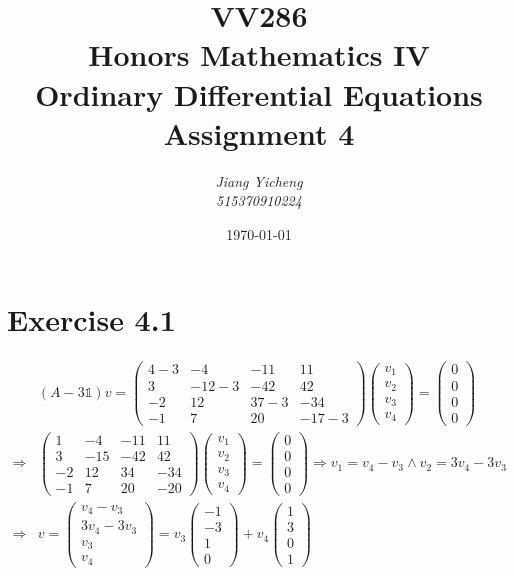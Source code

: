 \documentclass[a4paper,12pt,titlepage]{article}
\author{\textit{Jiang Yicheng}\\\textit{515370910224}}
\title{\textbf{VV286\\ Honors Mathematics IV\\
Ordinary Differential Equations\\
		Assignment 4}}
\date{\today}
\begin{document}
\maketitle

\section*{Exercise 4.1}
\begin{align*}
&(A-3\mathds{1})v=\left(\begin{array}{cccc}
4-3&-4&-11&11\\
3&-12-3&-42&42\\
-2&12&37-3&-34\\
-1&7&20&-17-3
\end{array}\right)\left(\begin{array}{c}
v_1\\
v_2\\
v_3\\
v_4
\end{array}\right)=\left(\begin{array}{c}
0\\
0\\
0\\
0
\end{array}\right)\\
\Rightarrow& \left(\begin{array}{cccc}
1&-4&-11&11\\
3&-15&-42&42\\
-2&12&34&-34\\
-1&7&20&-20
\end{array}\right)\left(\begin{array}{c}
v_1\\
v_2\\
v_3\\
v_4
\end{array}\right)=\left(\begin{array}{c}
0\\
0\\
0\\
0
\end{array}\right)\Rightarrow v_1=v_4-v_3\wedge v_2=3v_4-3v_3\\
\Rightarrow& v=\left(\begin{array}{c}
v_4-v_3\\
3v_4-3v_3\\
v_3\\
v_4
\end{array}\right)=v_3\left(\begin{array}{c}
-1\\
-3\\
1\\
0
\end{array}\right)+v_4\left(\begin{array}{c}
1\\
3\\
0\\
1
\end{array}\right)
\end{align*}
\end{document}
